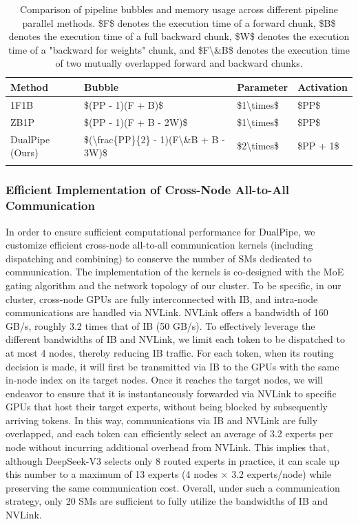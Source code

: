 \documentclass[11pt,a4paper]{article}
\begin{document}
\begin{table}[h]
\caption{Comparison of pipeline bubbles and memory usage across different pipeline parallel methods. \$F\$ denotes the execution time of a forward chunk, \$B\$ denotes the execution time of a full backward chunk, \$W\$ denotes the execution time of a "backward for weights" chunk, and \$F\textbackslash{}\&B\$ denotes the execution time of two mutually overlapped forward and backward chunks.}
\begin{tabular}{|l|l|l|l|}
\hline
Method & Bubble & Parameter & Activation \\ \hline
1F1B & \$(PP - 1)(F + B)\$ & \$1\textbackslash{}times\$ & \$PP\$ \\ \hline
ZB1P & \$(PP - 1)(F + B - 2W)\$ & \$1\textbackslash{}times\$ & \$PP\$ \\ \hline
DualPipe (Ours) & \$(\textbackslash{}frac\{PP\}\{2\} - 1)(F\textbackslash{}\&B + B - 3W)\$ & \$2\textbackslash{}times\$ & \$PP + 1\$ \\ \hline
 &  &  &  \\ \hline
\end{tabular}
\end{table}

\subsubsection{Efficient Implementation of Cross-Node All-to-All Communication}

In order to ensure sufficient computational performance for DualPipe, we customize efficient cross-node all-to-all communication kernels (including dispatching and combining) to conserve the number of SMs dedicated to communication. The implementation of the kernels is co-designed with the MoE gating algorithm and the network topology of our cluster. To be specific, in our cluster, cross-node GPUs are fully interconnected with IB, and intra-node communications are handled via NVLink. NVLink offers a bandwidth of 160 GB/s, roughly 3.2 times that of IB (50 GB/s). To effectively leverage the different bandwidths of IB and NVLink, we limit each token to be dispatched to at most 4 nodes, thereby reducing IB traffic. For each token, when its routing decision is made, it will first be transmitted via IB to the GPUs with the same in-node index on its target nodes. Once it reaches the target nodes, we will endeavor to ensure that it is instantaneously forwarded via NVLink to specific GPUs that host their target experts, without being blocked by subsequently arriving tokens. In this way, communications via IB and NVLink are fully overlapped, and each token can efficiently select an average of 3.2 experts per node without incurring additional overhead from NVLink. This implies that, although DeepSeek-V3 selects only 8 routed experts in practice, it can scale up this number to a maximum of 13 experts (4 nodes $\times$ 3.2 experts/node) while preserving the same communication cost. Overall, under such a communication strategy, only 20 SMs are sufficient to fully utilize the bandwidths of IB and NVLink.
\end{document}
